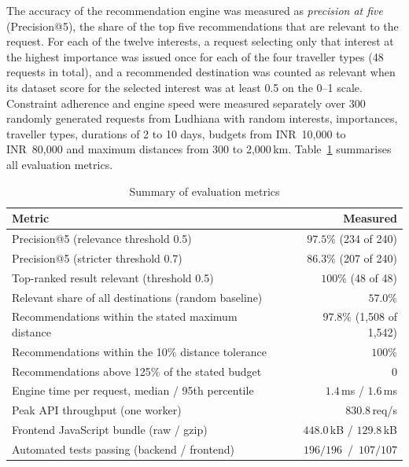 The accuracy of the recommendation engine was measured as
\emph{precision at five} (Precision@5), the share of the top five
recommendations that are relevant to the request. For each of the twelve
interests, a request selecting only that interest at the highest importance
was issued once for each of the four traveller types (48 requests in total),
and a recommended destination was counted as relevant when its dataset score
for the selected interest was at least 0.5 on the 0--1 scale. Constraint
adherence and engine speed were measured separately over 300 randomly
generated requests from Ludhiana with random interests, importances,
traveller types, durations of 2 to 10 days, budgets from INR~10{,}000 to
INR~80{,}000 and maximum distances from 300 to 2{,}000\,km.
Table~\ref{tab:engine} summarises all evaluation metrics.

\begin{table}[htbp]
\centering
\begin{tabular}{|l|r|}
  \hline
  \textbf{Metric} & \textbf{Measured} \\
  \hline
  Precision@5 (relevance threshold 0.5) & $97.5\%$ (234 of 240) \\
  \hline
  Precision@5 (stricter threshold 0.7) & $86.3\%$ (207 of 240) \\
  \hline
  Top-ranked result relevant (threshold 0.5) & $100\%$ (48 of 48) \\
  \hline
  Relevant share of all destinations (random baseline) & $57.0\%$ \\
  \hline
  Recommendations within the stated maximum distance & $97.8\%$
    (1{,}508 of 1{,}542) \\
  \hline
  Recommendations within the 10\% distance tolerance & $100\%$ \\
  \hline
  Recommendations above 125\% of the stated budget & $0$ \\
  \hline
  Engine time per request, median / 95th percentile & $1.4$\,ms /
    $1.6$\,ms \\
  \hline
  Peak API throughput (one worker) & $830.8$\,req/s \\
  \hline
  Frontend JavaScript bundle (raw / gzip) & $448.0$\,kB / $129.8$\,kB \\
  \hline
  Automated tests passing (backend / frontend) & $196/196$ \,/\,
    $107/107$ \\
  \hline
\end{tabular}
\caption{Summary of evaluation metrics}
\label{tab:engine}
\end{table}

